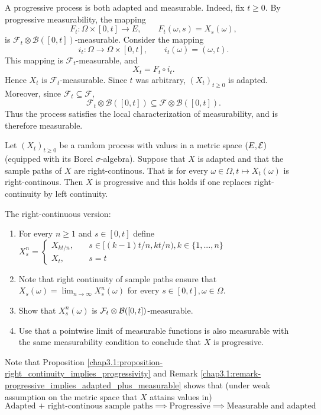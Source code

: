 \begin{remark} \label{chap3.1:remark-progressive_implies_adapted_plus_measurable}
A progressive process is both adapted and measurable.
Indeed, fix $t\geq0$. By progressive measurability, the mapping
$$
F_t:\Omega\times[0,t]\to E,
\qquad
F_t(\omega,s)=X_s(\omega),
$$
is $\mathcal F_t\otimes\mathcal B([0,t])$-measurable. Consider the mapping
$$
i_t:\Omega\to\Omega\times[0,t],
\qquad
i_t(\omega)=(\omega,t).
$$
This mapping is $\mathcal F_t$-measurable, and
$$
X_t=F_t\circ i_t.
$$
Hence $X_t$ is $\mathcal F_t$-measurable. Since $t$ was arbitrary, $(X_t)_{t\geq0}$ is adapted. Moreover, since $\mathcal F_t\subseteq\mathcal F$,
$$
\mathcal F_t\otimes\mathcal B([0,t])
\subseteq
\mathcal F\otimes\mathcal B([0,t]).
$$
Thus the process satisfies the local characterization of measurability, and is therefore measurable.
\end{remark}


\begin{proposition} \label{chap3.1:proposition-right_continuity_implies_progressivity}
Let $(X_t)_{t \geq 0}$ be a random process with values in a metric space $(E, \mathcal{E})$ (equipped with its Borel $\sigma$-algebra). Suppose that $X$ is adapted and that the sample paths of $X$ are right-continous. That is for every $\omega \in \Omega, t \mapsto X_t(\omega)$ is right-continous. Then $X$ is progressive and this holds if one replaces right-continuity by left continuity.
\end{proposition}
\begin{proofidea}
The right-continuous version:
\begin{enumerate}
    \item For every $n \geq 1$ and $s \in [0,t]$ define $X_s^n=\begin{cases}X_{kt/n}, \quad &s \in [(k-1)t/n, kt/n), k \in \{1,...,n\} \\ X_t, \quad &s = t \end{cases}$
    \item Note that right continuity of sample paths ensure that $X_s(\omega)=\lim_{n \to \infty} X_s^n(\omega)$ for every $s \in [0,t], \omega \in \Omega$.
    \item Show that $X_s^n(\omega)$ is $\mathcal{F}_t \otimes \mathcal{B}([0,t])$-measurable.
    \item Use that a pointwise limit of measurable functions is also measurable with the same measurability condition to conclude that $X$ is progressive.
\end{enumerate}
\end{proofidea}
\begin{remark}\label{chap3.1:remark-right_continuity_implies_progressivity_implies_adapted_plus_measurable}
Note that Proposition \ref{chap3.1:proposition-right_continuity_implies_progressivity} and Remark \ref{chap3.1:remark-progressive_implies_adapted_plus_measurable} shows that (under weak assumption on the metric space that $X$ attains values in)
$$\text{Adapted + right-continous sample paths} \implies \text{Progressive} \implies \text{Measurable and adapted}$$
\end{remark}

